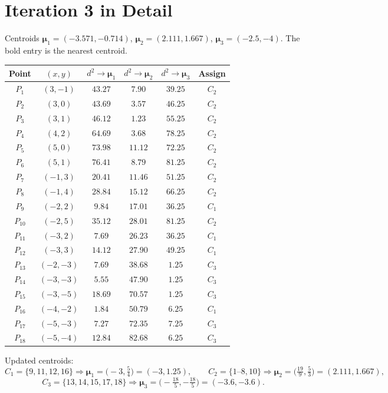 \documentclass[11pt,a4paper]{report}
\theoremstyle{definition}
\theoremstyle{plain}
\theoremstyle{remark}
\newcommand{\vmu}{\bm{\mu}}
\begin{document}
	\section{Iteration 3 in Detail}
	Centroids $\vmu_1=(-3.571,-0.714)$, $\vmu_2=(2.111,1.667)$, $\vmu_3=(-2.5,-4)$. The bold entry is the nearest centroid.
	\begin{center}
	\small
	\begin{tabular}{@{}ccccc c@{}}
	\toprule
	Point & $(x,y)$ & $d^2\!\to\vmu_1$ & $d^2\!\to\vmu_2$ & $d^2\!\to\vmu_3$ & Assign\\
	\midrule
	$P_{1}$ & $(3,-1)$ & $43.27$ & $\mathbf{7.90}$ & $39.25$ & $C_2$\\
	$P_{2}$ & $(3,0)$ & $43.69$ & $\mathbf{3.57}$ & $46.25$ & $C_2$\\
	$P_{3}$ & $(3,1)$ & $46.12$ & $\mathbf{1.23}$ & $55.25$ & $C_2$\\
	$P_{4}$ & $(4,2)$ & $64.69$ & $\mathbf{3.68}$ & $78.25$ & $C_2$\\
	$P_{5}$ & $(5,0)$ & $73.98$ & $\mathbf{11.12}$ & $72.25$ & $C_2$\\
	$P_{6}$ & $(5,1)$ & $76.41$ & $\mathbf{8.79}$ & $81.25$ & $C_2$\\
	$P_{7}$ & $(-1,3)$ & $20.41$ & $\mathbf{11.46}$ & $51.25$ & $C_2$\\
	$P_{8}$ & $(-1,4)$ & $28.84$ & $\mathbf{15.12}$ & $66.25$ & $C_2$\\
	$P_{9}$ & $(-2,2)$ & $\mathbf{9.84}$ & $17.01$ & $36.25$ & $C_1$\\
	$P_{10}$ & $(-2,5)$ & $35.12$ & $\mathbf{28.01}$ & $81.25$ & $C_2$\\
	$P_{11}$ & $(-3,2)$ & $\mathbf{7.69}$ & $26.23$ & $36.25$ & $C_1$\\
	$P_{12}$ & $(-3,3)$ & $\mathbf{14.12}$ & $27.90$ & $49.25$ & $C_1$\\
	$P_{13}$ & $(-2,-3)$ & $7.69$ & $38.68$ & $\mathbf{1.25}$ & $C_3$\\
	$P_{14}$ & $(-3,-3)$ & $5.55$ & $47.90$ & $\mathbf{1.25}$ & $C_3$\\
	$P_{15}$ & $(-3,-5)$ & $18.69$ & $70.57$ & $\mathbf{1.25}$ & $C_3$\\
	$P_{16}$ & $(-4,-2)$ & $\mathbf{1.84}$ & $50.79$ & $6.25$ & $C_1$\\
	$P_{17}$ & $(-5,-3)$ & $7.27$ & $72.35$ & $\mathbf{7.25}$ & $C_3$\\
	$P_{18}$ & $(-5,-4)$ & $12.84$ & $82.68$ & $\mathbf{6.25}$ & $C_3$\\
	\bottomrule
	\end{tabular}
	\end{center}
	Updated centroids:
	\[
C_1=\{9,11,12,16\}\Rightarrow\vmu_1=\bigl(-3,\tfrac{5}{4}\bigr)=(-3,1.25),\qquad
C_2=\{1\text{--}8,10\}\Rightarrow\vmu_2=\bigl(\tfrac{19}{9},\tfrac{5}{3}\bigr)=(2.111,1.667),
\]
\[
C_3=\{13,14,15,17,18\}\Rightarrow\vmu_3=\bigl(-\tfrac{18}{5},-\tfrac{18}{5}\bigr)=(-3.6,-3.6).
\]
	
\end{document}
